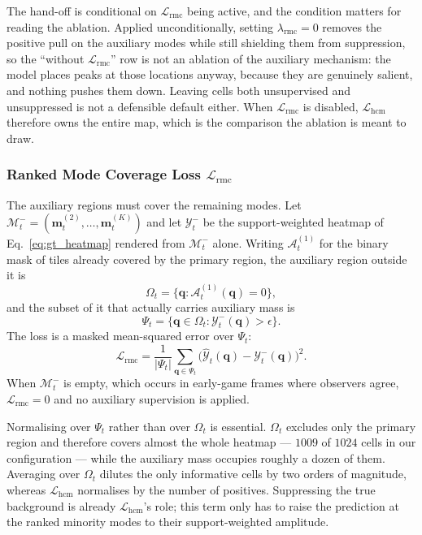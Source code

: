 \documentclass[preprint,12pt]{elsarticle}
\begin{document}
The hand-off is conditional on $\mathcal{L}_{\text{rmc}}$ being active, and the
condition matters for reading the ablation. Applied unconditionally, setting
$\lambda_{\text{rmc}} = 0$ removes the positive pull on the auxiliary modes
while still shielding them from suppression, so the ``without
$\mathcal{L}_{\text{rmc}}$'' row is not an ablation of the auxiliary mechanism:
the model places peaks at those locations anyway, because they are genuinely
salient, and nothing pushes them down. Leaving cells both unsupervised and
unsuppressed is not a defensible default either. When $\mathcal{L}_{\text{rmc}}$
is disabled, $\mathcal{L}_{\text{hcm}}$ therefore owns the entire map, which is
the comparison the ablation is meant to draw.

\subsubsection{Ranked Mode Coverage Loss $\mathcal{L}_{\text{rmc}}$}
\label{subsec:rmc_loss}

The auxiliary regions must cover the remaining modes. Let
$\mathcal{M}^-_t = (\mathbf{m}^{(2)}_t, \ldots, \mathbf{m}^{(K)}_t)$ and let
$\mathcal{Y}^-_t$ be the support-weighted heatmap of Eq.~\ref{eq:gt_heatmap}
rendered from $\mathcal{M}^-_t$ alone. Writing $\mathcal{A}^{(1)}_t$ for the
binary mask of tiles already covered by the primary region, the auxiliary
region outside it is
\begin{equation}
  \Omega_t = \bigl\{\mathbf{q} : \mathcal{A}^{(1)}_t(\mathbf{q}) = 0\bigr\},
  \label{eq:omega}
\end{equation}
and the subset of it that actually carries auxiliary mass is
\begin{equation}
  \Psi_t = \bigl\{\mathbf{q} \in \Omega_t : \mathcal{Y}^-_t(\mathbf{q})
    > \epsilon \bigr\}.
  \label{eq:psi}
\end{equation}
The loss is a masked mean-squared error over $\Psi_t$:
\begin{equation}
  \mathcal{L}_{\text{rmc}} = \frac{1}{|\Psi_t|}\sum_{\mathbf{q} \in \Psi_t}
    \bigl(\hat{\mathcal{Y}}_t(\mathbf{q}) - \mathcal{Y}^-_t(\mathbf{q})\bigr)^2.
  \label{eq:rmc_loss}
\end{equation}
When $\mathcal{M}^-_t$ is empty, which occurs in early-game frames where
observers agree, $\mathcal{L}_{\text{rmc}} = 0$ and no auxiliary supervision is
applied.

Normalising over $\Psi_t$ rather than over $\Omega_t$ is essential. $\Omega_t$
excludes only the primary region and therefore covers almost the whole
heatmap — $1009$ of $1024$ cells in our configuration — while the auxiliary
mass occupies roughly a dozen of them. Averaging over $\Omega_t$ dilutes the
only informative cells by two orders of magnitude, whereas
$\mathcal{L}_{\text{hcm}}$ normalises by the number of positives. Suppressing
the true background is already $\mathcal{L}_{\text{hcm}}$'s role; this term
only has to raise the prediction at the ranked minority modes to their
support-weighted amplitude.
\end{document}

